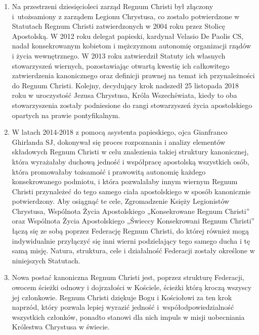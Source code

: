 \begin{enumerate}
\item Na przestrzeni dziesięcioleci zarząd Regnum Christi był złączony \mbox{i utożsamiony} z zarządem Legionu Chrystusa, co zostało potwierdzone w Statutach Regnum Christi zatwierdzonych w 2004 roku przez Stolicę Apostolską. W 2012 roku delegat papieski, kardynał Velasio De Paolis CS, nadał konsekrowanym kobietom i mężczyznom autonomię organizacji rządów i życia wewnętrznego. W 2013 roku zatwierdził Statuty ich własnych stowarzyszeń wiernych, pozostawiając otwartą kwestię ich całkowitego zatwierdzenia kanonicznego oraz definicji prawnej na temat ich przynależności do Regnum Christi. Kolejny, decydujący krok nadszedł 25 listopada 2018 roku w uroczystość Jezusa Chrystusa, Króla Wszechświata, kiedy to oba stowarzyszenia zostały podniesione do rangi stowarzyszeń życia apostolskiego opartych na prawie pontyfikalnym.


\item W latach 2014-2018 z pomocą asystenta papieskiego, ojca Gianfranco Ghirlanda SJ, dokonywał się proces rozpoznania i analizy elementów składowych Regnum Christi w celu znalezienia takiej struktury kanonicznej, która wyrażałaby duchową jedność i współpracę apostolską wszystkich osób, która promowałaby tożsamość i prawowitą autonomię każdego konsekrowanego podmiotu, i która pozwalałaby innym wiernym Regnum Christi przynależeć do tego samego ciała apostolskiego w sposób kanonicznie potwierdzony. Aby osiągnąć te cele, Zgromadzenie Księży Legionistów Chrystusa, Wspólnota Życia Apostolskiego „Konsekrowane Regnum Christi” oraz Wspólnota Życia Apostolskiego „Świeccy Konsekrowani Regnum Christi” łączą się ze sobą poprzez Federację Regnum Christi, do której również mogą indywidualnie przyłączyć się inni wierni podzielający tego samego ducha i tę samą misję. Natura, struktura, cele i działalność Federacji zostały określone w niniejszych Statutach.


\item Nowa postać kanoniczna Regnum Christi jest, poprzez strukturę Federacji, owocem ścieżki odnowy i dojrzałości w Kościele, ścieżki którą kroczą wszyscy jej członkowie. Regnum Christi dziękuje Bogu i Kościołowi za ten krok naprzód, który pozwala lepiej wyrazić jedność \mbox{i współodpowiedzialność} wszystkich członków, ponadto stanowi dla nich impuls w misji uobecniania Królestwa Chrystusa w świecie.


\end{enumerate}




